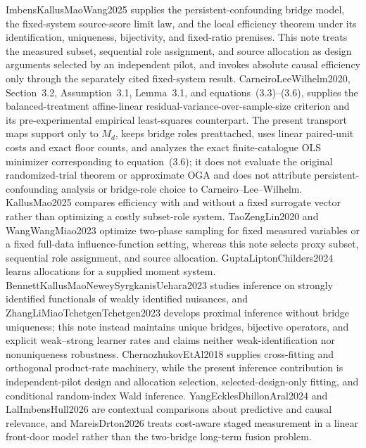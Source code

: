 ImbensKallusMaoWang2025 supplies the persistent-confounding bridge model, the fixed-system source-score limit law, and the local efficiency theorem under its identification, uniqueness, bijectivity, and fixed-ratio premises.  This note treats the measured subset, sequential role assignment, and source allocation as design arguments selected by an independent pilot, and invokes absolute causal efficiency only through the separately cited fixed-system result.  CarneiroLeeWilhelm2020, Section~3.2, Assumption~3.1, Lemma~3.1, and equations~(3.3)--(3.6), supplies the balanced-treatment affine-linear residual-variance-over-sample-size criterion and its pre-experimental empirical least-squares counterpart.  The present transport maps support only to \(M_d\), keeps bridge roles preattached, uses linear paired-unit costs and exact floor counts, and analyzes the exact finite-catalogue OLS minimizer corresponding to equation~(3.6); it does not evaluate the original randomized-trial theorem or approximate OGA and does not attribute persistent-confounding analysis or bridge-role choice to Carneiro--Lee--Wilhelm.  KallusMao2025 compares efficiency with and without a fixed surrogate vector rather than optimizing a costly subset-role system.  TaoZengLin2020 and WangWangMiao2023 optimize two-phase sampling for fixed measured variables or a fixed full-data influence-function setting, whereas this note selects proxy subset, sequential role assignment, and source allocation.  GuptaLiptonChilders2024 learns allocations for a supplied moment system.  BennettKallusMaoNeweySyrgkanisUehara2023 studies inference on strongly identified functionals of weakly identified nuisances, and ZhangLiMiaoTchetgenTchetgen2023 develops proximal inference without bridge uniqueness; this note instead maintains unique bridges, bijective operators, and explicit weak--strong learner rates and claims neither weak-identification nor nonuniqueness robustness.  ChernozhukovEtAl2018 supplies cross-fitting and orthogonal product-rate machinery, while the present inference contribution is independent-pilot design and allocation selection, selected-design-only fitting, and conditional random-index Wald inference.  YangEcklesDhillonAral2024 and LalImbensHull2026 are contextual comparisons about predictive and causal relevance, and MareisDrton2026 treats cost-aware staged measurement in a linear front-door model rather than the two-bridge long-term fusion problem.